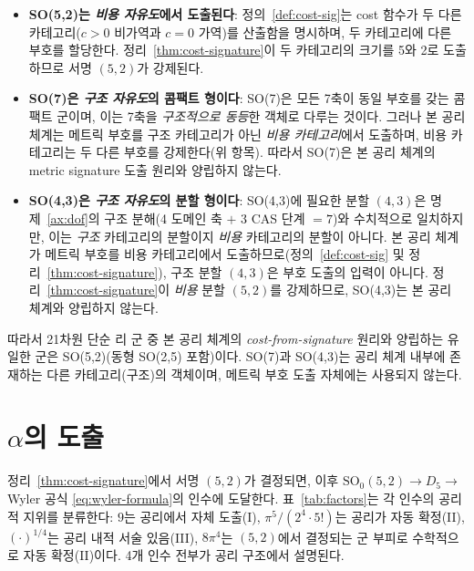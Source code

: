 \documentclass[entropy,article,submit,pdftex,oneauthor]{Definitions/mdpi}
\begin{document}
\begin{itemize}
\item \textbf{SO(5,2)는 \emph{비용 자유도}에서 도출된다}: 정의~\ref{def:cost-sig}는 cost 함수가 두 다른 카테고리($c > 0$ 비가역과 $c = 0$ 가역)를 산출함을 명시하며, 두 카테고리에 다른 부호를 할당한다. 정리~\ref{thm:cost-signature}이 두 카테고리의 크기를 5와 2로 도출하므로 서명 $(5,2)$가 강제된다.

\item \textbf{SO(7)은 \emph{구조 자유도}의 콤팩트 형이다}: SO(7)은 모든 7축이 동일 부호를 갖는 콤팩트 군이며, 이는 7축을 \emph{구조적으로 동등}한 객체로 다루는 것이다. 그러나 본 공리 체계는 메트릭 부호를 구조 카테고리가 아닌 \emph{비용 카테고리}에서 도출하며, 비용 카테고리는 두 다른 부호를 강제한다(위 항목). 따라서 SO(7)은 본 공리 체계의 metric signature 도출 원리와 양립하지 않는다.

\item \textbf{SO(4,3)은 \emph{구조 자유도}의 분할 형이다}: SO(4,3)에 필요한 분할 $(4,3)$은 명제~\ref{ax:dof}의 구조 분해(4 도메인 축 $+$ 3 CAS 단계 $= 7$)와 수치적으로 일치하지만, 이는 \emph{구조} 카테고리의 분할이지 \emph{비용} 카테고리의 분할이 아니다. 본 공리 체계가 메트릭 부호를 비용 카테고리에서 도출하므로(정의~\ref{def:cost-sig} 및 정리~\ref{thm:cost-signature}), 구조 분할 $(4,3)$은 부호 도출의 입력이 아니다. 정리~\ref{thm:cost-signature}이 \emph{비용} 분할 $(5,2)$를 강제하므로, SO(4,3)는 본 공리 체계와 양립하지 않는다.
\end{itemize}

따라서 21차원 단순 리 군 중 본 공리 체계의 \emph{cost-from-signature} 원리와 양립하는 유일한 군은 SO(5,2)(동형 SO(2,5) 포함)이다. SO(7)과 SO(4,3)는 공리 체계 내부에 존재하는 다른 카테고리(구조)의 객체이며, 메트릭 부호 도출 자체에는 사용되지 않는다.

\section{$\alpha$의 도출}
\label{sec:derivation}

정리~\ref{thm:cost-signature}에서 서명 $(5,2)$가 결정되면, 이후 $\mathrm{SO}_0(5,2) \to D_5 \to$ Wyler 공식 \eqref{eq:wyler-formula}의 인수에 도달한다. 표~\ref{tab:factors}는 각 인수의 공리적 지위를 분류한다: $9$는 공리에서 자체 도출(I), $\pi^5/(2^4 \cdot 5!)$는 공리가 자동 확정(II), $(\cdot)^{1/4}$는 공리 내적 서술 있음(III), $8\pi^4$는 $(5,2)$에서 결정되는 군 부피로 수학적으로 자동 확정(II)이다. 4개 인수 전부가 공리 구조에서 설명된다.
\end{document}
